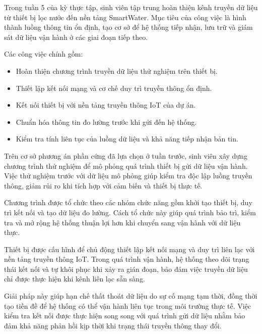 

Trong tuần 5 của kỳ thực tập, sinh viên tập trung hoàn thiện kênh truyền dữ liệu từ thiết bị lọc nước đến nền tảng SmartWater. Mục tiêu của công việc là hình thành luồng thông tin ổn định, tạo cơ sở để hệ thống tiếp nhận, lưu trữ và giám sát dữ liệu vận hành ở các giai đoạn tiếp theo.

Các công việc chính gồm:

\begin{itemize}
    \item Hoàn thiện chương trình truyền dữ liệu thử nghiệm trên thiết bị.
    \item Thiết lập kết nối mạng và cơ chế duy trì truyền thông ổn định.
    \item Kết nối thiết bị với nền tảng truyền thông IoT của dự án.
    \item Chuẩn hóa thông tin đo lường trước khi gửi đến hệ thống.
    \item Kiểm tra tính liên tục của luồng dữ liệu và khả năng tiếp nhận bản tin.
\end{itemize}



Trên cơ sở phương án phần cứng đã lựa chọn ở tuần trước, sinh viên xây dựng chương trình thử nghiệm để mô phỏng quá trình thiết bị gửi dữ liệu vận hành. Việc thử nghiệm trước với dữ liệu mô phỏng giúp kiểm tra độc lập luồng truyền thông, giảm rủi ro khi tích hợp với cảm biến và thiết bị thực tế.

Chương trình được tổ chức theo các nhóm chức năng gồm khởi tạo thiết bị, duy trì kết nối và tạo dữ liệu đo lường. Cách tổ chức này giúp quá trình bảo trì, kiểm tra và mở rộng hệ thống thuận lợi hơn khi chuyển sang vận hành với dữ liệu thực.


Thiết bị được cấu hình để chủ động thiết lập kết nối mạng và duy trì liên lạc với nền tảng truyền thông IoT. Trong quá trình vận hành, hệ thống theo dõi trạng thái kết nối và tự khôi phục khi xảy ra gián đoạn, bảo đảm việc truyền dữ liệu chỉ được thực hiện khi kênh liên lạc sẵn sàng.

Giải pháp này giúp hạn chế thất thoát dữ liệu do sự cố mạng tạm thời, đồng thời tạo tiền đề để hệ thống có thể vận hành liên tục trong môi trường thực tế. Việc kiểm tra kết nối được thực hiện song song với quá trình gửi dữ liệu nhằm bảo đảm khả năng phản hồi kịp thời khi trạng thái truyền thông thay đổi.

